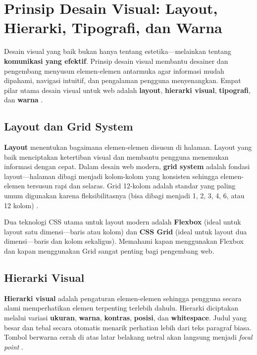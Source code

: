 \section{Prinsip Desain Visual: Layout, Hierarki, Tipografi, dan Warna}

Desain visual yang baik bukan hanya tentang estetika---melainkan tentang \textbf{komunikasi yang efektif}. Prinsip desain visual membantu desainer dan pengembang menyusun elemen-elemen antarmuka agar informasi mudah dipahami, navigasi intuitif, dan pengalaman pengguna menyenangkan. Empat pilar utama desain visual untuk web adalah \textbf{layout}, \textbf{hierarki visual}, \textbf{tipografi}, dan \textbf{warna} \cite{mdnCss}.

\subsection{Layout dan Grid System}

\textbf{Layout} menentukan bagaimana elemen-elemen disusun di halaman. Layout yang baik menciptakan ketertiban visual dan membantu pengguna menemukan informasi dengan cepat. Dalam desain web modern, \textbf{grid system} adalah fondasi layout---halaman dibagi menjadi kolom-kolom yang konsisten sehingga elemen-elemen tersusun rapi dan selaras. Grid 12-kolom adalah standar yang paling umum digunakan karena fleksibilitasnya (bisa dibagi menjadi 1, 2, 3, 4, 6, atau 12 kolom) \cite{webdevLearn}.

Dua teknologi CSS utama untuk layout modern adalah \textbf{Flexbox} (ideal untuk layout satu dimensi---baris atau kolom) dan \textbf{CSS Grid} (ideal untuk layout dua dimensi---baris dan kolom sekaligus). Memahami kapan menggunakan Flexbox dan kapan menggunakan Grid sangat penting bagi pengembang web.

\subsection{Hierarki Visual}

\textbf{Hierarki visual} adalah pengaturan elemen-elemen sehingga pengguna secara alami memperhatikan elemen terpenting terlebih dahulu. Hierarki diciptakan melalui variasi \textbf{ukuran}, \textbf{warna}, \textbf{kontras}, \textbf{posisi}, dan \textbf{whitespace}. Judul yang besar dan tebal secara otomatis menarik perhatian lebih dari teks paragraf biasa. Tombol berwarna cerah di atas latar belakang netral akan langsung menjadi \textit{focal point} \cite{mdnCss}.

